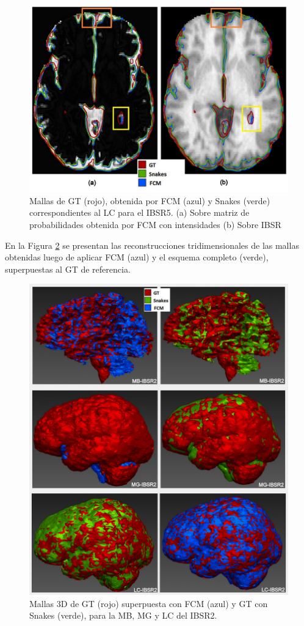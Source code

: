 \begin{figure}[H]
	\centering
	\includegraphics[scale=0.5]{images/LC_1.jpg}
	\caption{Mallas de GT (rojo), obtenida por FCM (azul) y Snakes (verde) correspondientes al LC para el IBSR5. (a) Sobre matriz de probabilidades obtenida por FCM con intensidades (b) Sobre IBSR}
	\label{fig:cualitativa_lc}
\end{figure}

En la Figura \ref{fig:cualitativa_3dmagic} se presentan las reconstrucciones tridimensionales de las mallas obtenidas luego de aplicar FCM (azul) y el esquema completo (verde), superpuestas al GT de referencia.

\begin{figure}[H]
	\centering
	\includegraphics[scale=0.08]{images/mallas_3D.jpg}
	\caption{Mallas 3D de GT (rojo) superpuesta con FCM (azul) y GT con Snakes (verde), para la MB, MG y LC del IBSR2.
		}
	\label{fig:cualitativa_3dmagic}
\end{figure}

